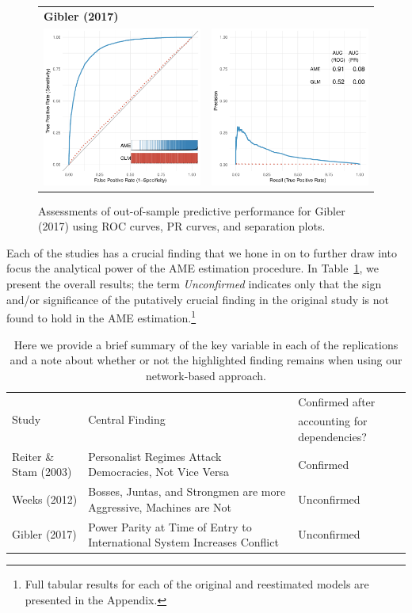 \begin{figure}
\begin{tabular}{cc}
		\multicolumn{2}{l}{\textbf{Gibler (2017)}} \\
		\includegraphics[width=.4\textwidth]{gibler_roc_outSample.pdf} & 
		\includegraphics[width=.4\textwidth]{gibler_pr_outSample.pdf} \\
	\end{tabular}
	\caption{Assessments of out-of-sample predictive performance for Gibler (2017) using ROC curves, PR curves, and separation plots.}
	\label{fig:perf}	
\end{figure}

Each of the studies has a crucial finding that we hone in on to further draw into focus the analytical power of the AME estimation procedure.  In Table~\ref{tab:modelFindingSumm}, we present the overall results; the term \textit{Unconfirmed} indicates only that the sign and/or significance of the putatively crucial finding in the original study is not found to hold in the AME estimation.\footnote{Full tabular results for each of the original and reestimated models are presented in the Appendix.}

\begin{table}[ht]
\centering
\caption{Here we provide a brief summary of the key variable in each of the replications and a note about whether or not the highlighted finding remains when using our network-based approach.}
	\begin{tabular}{l p{7cm} l} \toprule
		\multirow{2}{*}{Study} & \multirow{2}{*}{Central Finding} &  Confirmed after \\
		& &  accounting for dependencies? \\ \toprule
		Reiter \& Stam (2003) & Personalist Regimes Attack Democracies, Not Vice Versa & {Confirmed} \\ \midrule
		Weeks (2012) & Bosses, Juntas, and Strongmen are more Aggressive, Machines are Not & {Unconfirmed} \\\midrule
		Gibler (2017) & Power Parity at Time of Entry to International System Increases Conflict & {Unconfirmed}\\ \bottomrule
	\end{tabular}
	\label{tab:modelFindingSumm}
\end{table}

